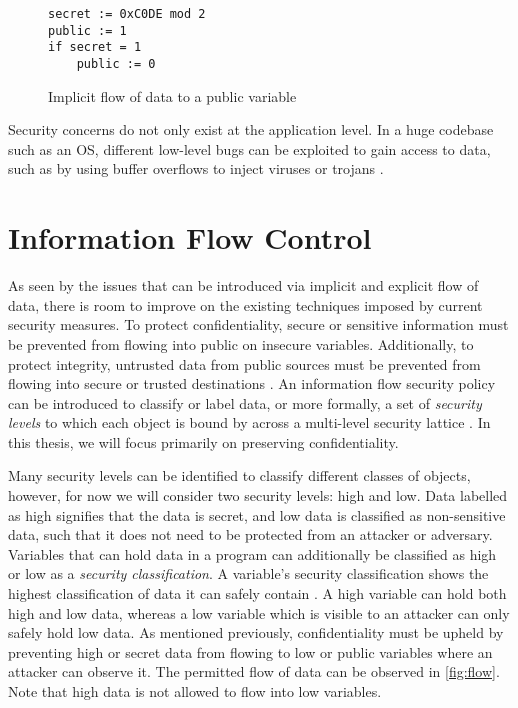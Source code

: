 \begin{figure}
    \begin{lstlisting}
secret := 0xC0DE mod 2
public := 1
if secret = 1
    public := 0
        \end{lstlisting}
    \caption{Implicit flow of data to a public variable}
    \label{fig:implicit}
\end{figure}

Security concerns do not only exist at the application level. In a huge codebase such as an OS, different low-level bugs can be exploited to gain access to data, such as by using buffer overflows to inject viruses or trojans \cite{agten2012recent}.

\section{Information Flow Control}
As seen by the issues that can be introduced via implicit and explicit flow of data, there is room to improve on the existing techniques imposed by current security measures. To protect confidentiality, secure or sensitive information must be prevented from flowing into public on insecure variables. Additionally, to protect integrity, untrusted data from public sources must be prevented from flowing into secure or trusted destinations \cite{balliu2014logics}. An information flow security policy can be introduced to classify or label data, or more formally, a set of \textit{security levels} to which each object is bound by across a multi-level security lattice \cite{denning1976lattice}. In this thesis, we will focus primarily on preserving confidentiality.

Many security levels can be identified to classify different classes of objects, however, for now we will consider two security levels: high and low. Data labelled as high signifies that the data is secret, and low data is classified as non-sensitive data, such that it does not need to be protected from an attacker or adversary. Variables that can hold data in a program can additionally be classified as high or low as a \textit{security classification}. A variable's security classification shows the highest classification of data it can safely contain \cite{winter2020information}. A high variable can hold both high and low data, whereas a low variable which is visible to an attacker can only safely hold low data. As mentioned previously, confidentiality must be upheld by preventing high or secret data from flowing to low or public variables where an attacker can observe it. The permitted flow of data can be observed in \ref{fig:flow}. Note that high data is not allowed to flow into low variables.

